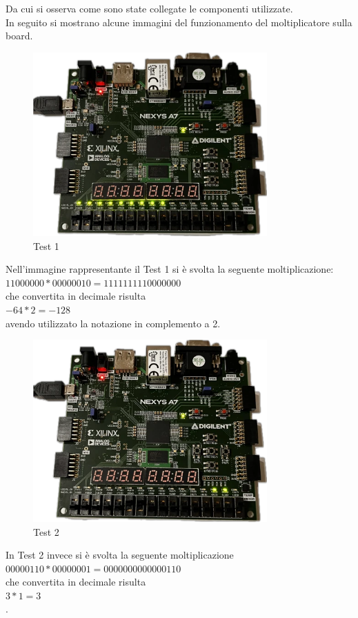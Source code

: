 Da cui si osserva come sono state collegate le componenti utilizzate.\\
In seguito si mostrano alcune immagini del funzionamento del moltiplicatore sulla board.
\begin{figure}[H]
	\centering
	\includegraphics[width=0.8\textwidth]{img/onBoard/booth_test1}
	\caption{Test 1}
	\label{test1} 
\end{figure}
Nell'immagine rappresentante il Test 1 si è svolta la seguente moltiplicazione:\\
$11000000 * 00000010 = 1111111110000000$\\
che convertita in decimale risulta\\
$-64 * 2 = -128$\\
avendo utilizzato la notazione in complemento a 2.
\begin{figure}[H]
	\centering
	\includegraphics[width=0.8\textwidth]{img/onBoard/booth_test2}
	\caption{Test 2}
	\label{test1} 
\end{figure}
In Test 2 invece si è svolta la seguente moltiplicazione\\
$00000110 * 00000001 = 0000000000000110$ \\
che convertita in decimale risulta\\
$3 * 1 = 3$\\.
